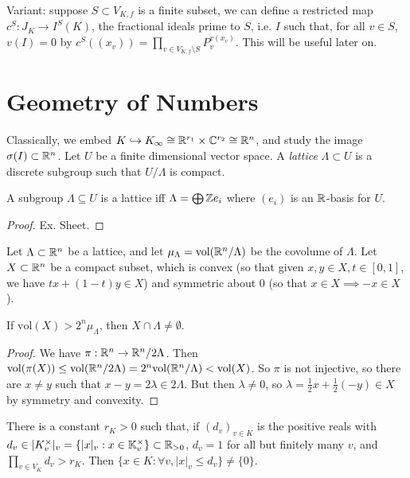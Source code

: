 \documentclass[10pt,a4paper]{article}
\begin{document}
Variant: suppose $S \subset V_{K,f}$ is a finite subset, we can define a restricted map $c^S : J_K \to I^S(K)$, the fractional ideals prime to $S$, i.e. $I$ such that, for all $v \in S$, $v(I) = 0$ by $c^S((x_v)) = \prod_{v \in V_{K,f}\setminus S} P_v^{v(x_v)}$. This will be useful later on.

\section{Geometry of Numbers}
Classically, we embed $K \hookrightarrow K_\infty \cong \mathbb{R}^{r_1}\times \mathbb{C}^{r_2} \cong \mathbb{R}^n$, and study the image $\sigma(I) \subset \mathbb{R}^n$. Let $U$ be a finite dimensional vector space. A \emph{lattice} $\Lambda \subset U$ is a discrete subgroup such that $U/\Lambda$ is compact.
\begin{proposition}
  A subgroup $\Lambda \subseteq U$ is a lattice iff $\Lambda = \bigoplus \mathbb{Z} e_i$ where $(e_i)$ is an $\mathbb{R}$-basis for $U$.
\end{proposition}
\begin{proof}
  Ex. Sheet.
\end{proof}
\begin{theorem}[Minkowski]
  Let $\Lambda \subset \mathbb{R}^n$ be a lattice, and let $\mu_{\Lambda} = \text{vol}(\mathbb{R}^n/\Lambda)$ be the covolume of $\Lambda$. Let $X \subset \mathbb{R}^n$ be a compact subset, which is convex (so that given $x, y \in X, t \in [0,1]$, we have $tx + (1-t)y \in X$) and symmetric about 0 (so that $x \in X \implies -x \in X$).

  If $\text{vol}(X) > 2^n \mu_{\Lambda}$, then $X \cap \Lambda \neq \emptyset$.
\end{theorem}
\begin{proof}
  We have $\pi:\mathbb{R}^n \to \mathbb{R}^n/2\Lambda$. Then $\text{vol}(\pi(X)) \leq \text{vol}(\mathbb{R}^n/2\Lambda) = 2^n \text{vol}(\mathbb{R}^n/\Lambda) < \text{vol}(X)$. So $\pi$ is not injective, so there are $x \neq y$ such that $x - y = 2 \lambda \in 2\Lambda$. But then $\lambda \neq 0$, so $\lambda = \frac12 x + \frac12(-y) \in X$ by symmetry and convexity.
\end{proof}
\begin{theorem}
  There is a constant $r_K > 0$ such that, if $(d_v)_{v\in K}$ is the positive reals with $d_v \in |K_v^\times|_v = \{|x|_v : x \in \mathbb{K}_v^\times\}\subset \mathbb{R}_{>0}$, $d_v = 1$ for all but finitely many $v$, and $\prod_{v \in V_K}d_v > r_K$. Then $\{x \in K:\forall v, |x|_v \leq d_v\} \neq \{0\}$.
\end{theorem}
\end{document}
